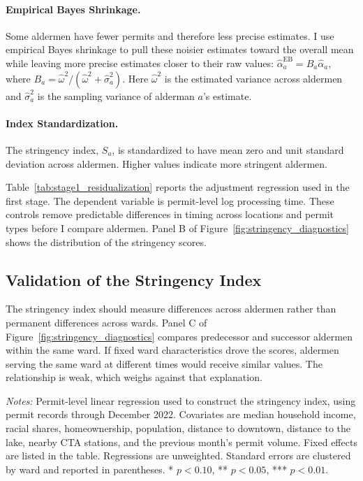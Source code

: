 \paragraph{Empirical Bayes Shrinkage.}
Some aldermen have fewer permits and therefore less precise estimates.
I use empirical Bayes shrinkage to pull these noisier estimates toward the overall mean while leaving more precise estimates closer to their raw values:
$\hat{\alpha}_a^{\text{EB}} = B_a \hat{\alpha}_a$, where $B_a = \hat{\omega}^2/(\hat{\omega}^2 + \hat{\sigma}_a^2)$.
Here $\hat{\omega}^2$ is the estimated variance across aldermen and $\hat{\sigma}_a^2$ is the sampling variance of alderman $a$'s estimate.

\paragraph{Index Standardization.}
The stringency index, $S_a$, is standardized to have mean zero and unit standard deviation across aldermen.
Higher values indicate more stringent aldermen.

Table~\ref{tab:stage1_residualization} reports the adjustment regression used in the first stage.
The dependent variable is permit-level log processing time.
These controls remove predictable differences in timing across locations and permit types before I compare aldermen.
Panel B of Figure~\ref{fig:stringency_diagnostics} shows the distribution of the stringency scores.

\subsection{Validation of the Stringency Index}
\label{app:stringency_validation}

The stringency index should measure differences across aldermen rather than permanent differences across wards.
Panel C of Figure~\ref{fig:stringency_diagnostics} compares predecessor and successor aldermen within the same ward.
If fixed ward characteristics drove the scores, aldermen serving the same ward at different times would receive similar values.
The relationship is weak, which weighs against that explanation.

\begin{table}[htbp]
    \caption{Factors Associated with Permit Processing Times}
    \label{tab:stage1_residualization}
    

    \footnotesize
    \textit{Notes:} Permit-level linear regression used to construct the stringency index, using permit records through December 2022.
    Covariates are median household income, racial shares, homeownership, population, distance to downtown, distance to the lake, nearby CTA stations, and the previous month's permit volume.
    Fixed effects are listed in the table.
    Regressions are unweighted.
    Standard errors are clustered by ward and reported in parentheses. * $p<0.10$, ** $p<0.05$, *** $p<0.01$.
\end{table}


